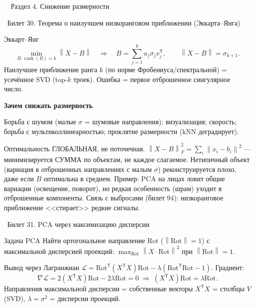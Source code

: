 \documentclass[12pt, a4paper]{article}
\newcommand{\razdel}[2]{%
  \clearpage%
  \noindent\colorbox{razdelcol}{\parbox{\dimexpr\linewidth-2\fboxsep\relax}{%
    \color{white}\LARGE\bfseries\strut\ \ Раздел #1. #2%
  }}%
  \vspace{10pt}%
}
\newcommand{\bilet}[2]{%
  \vspace{10pt}%
  \noindent\colorbox{qcolor}{\parbox{\dimexpr\linewidth-2\fboxsep\relax}{%
    \color{white}\large\bfseries\strut\ Билет #1. #2%
  }}%
  \nopagebreak\vspace{5pt}\par\nopagebreak%
}
\newcommand{\qsub}[1]{%
  \vspace{5pt}%
  {\bfseries\color{defblue} #1}%
  \par\vspace{2pt}%
}
\newcommand{\rank}{\operatorname{rank}}
\newcommand{\tr}{^{\mathsf{T}}}
\newcommand{\norm}[1]{\left\lVert #1 \right\rVert}
\begin{document}
\razdel{4}{Снижение размерности}

\bilet{30}{Теорема о наилучшем низкоранговом приближении (Эккарта--Янга)}

\begin{thmbox}{Эккарт--Янг}
\[
  \min_{B\colon \rank(B) = k} \norm{X - B} \quad\Longrightarrow\quad B = \sum_{j=1}^k u_j\sigma_j v_j\tr, \qquad \norm{X - B} = \sigma_{k+1}.
\]
Наилучшее приближение ранга $k$ (по норме Фробениуса/спектральной) = усечённое SVD (top-$k$ троек). Ошибка = первое отброшенное сингулярное число.
\end{thmbox}

\qsub{Зачем снижать размерность}
Борьба с шумом (малые $\sigma$ = шумовые направления); визуализация; скорость; борьба с мультиколлинеарностью; проклятие размерности (kNN деградирует).

\begin{fishkabox}
Оптимальность ГЛОБАЛЬНАЯ, не поточечная. $\norm{X - B}_F^2 = \sum_i\norm{x_i - b_i}^2$ --- минимизируется СУММА по объектам, не каждое слагаемое. Нетипичный объект (вариация в отброшенных направлениях с малым $\sigma$) реконструируется плохо, даже если $B$ оптимальна в среднем. Пример: PCA на лицах ловит общие вариации (освещение, поворот), но редкая особенность (шрам) уходит в отброшенные компоненты. Связь с выбросами (билет 94): низкоранговое приближение <<стирает>> редкие сигналы.
\end{fishkabox}

\bilet{31}{PCA через максимизацию дисперсии}

\begin{defbox}{Задача PCA}
Найти ортогональное направление $\text{Rot}$ ($\norm{\text{Rot}} = 1$) с максимальной дисперсией проекций: $\max_{\text{Rot}}\norm{X\cdot\text{Rot}}^2$ при $\norm{\text{Rot}} = 1$.
\end{defbox}

\begin{proofbox}{Вывод через Лагранжиан}
$\mathcal{L} = \text{Rot}\tr(X\tr X)\text{Rot} - \lambda(\text{Rot}\tr\text{Rot} - 1)$. Градиент:
\[
  \nabla\mathcal{L} = 2(X\tr X)\text{Rot} - 2\lambda\text{Rot} = 0 \;\Longrightarrow\; (X\tr X)\text{Rot} = \lambda\text{Rot}.
\]
Направления максимальной дисперсии = собственные векторы $X\tr X$ = столбцы $V$ (SVD), $\lambda = \sigma^2$ = дисперсии проекций.
\end{proofbox}
\end{document}
